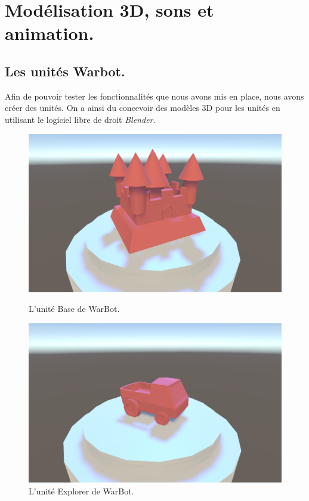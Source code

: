 \documentclass{report}
\begin{document}
\section{Modélisation 3D, sons et animation.}

\subsection{Les unités Warbot.}
Afin de pouvoir tester les fonctionnalités que nous avons mis en place, nous avons créer des unités. On a ainsi du concevoir des modèles 3D pour les unités en utilisant le logiciel libre de droit \textit{Blender}.

\begin{figure}[h]
    \begin{minipage}[c]{.46\linewidth}
        \centering
        \includegraphics[scale=0.25]{WarBaseImage}
        \caption{L'unité Base de WarBot.}
    \end{minipage}
    \hfill%
    \begin{minipage}[c]{.46\linewidth}
        \centering
        \includegraphics[scale=0.25]{WarExplorerImage}
        \caption{L'unité Explorer de WarBot.}
    \end{minipage}
\end{figure}
\end{document}
